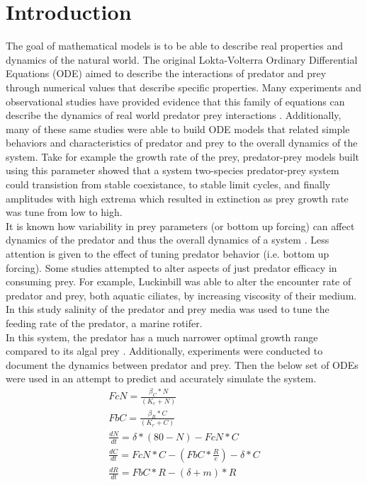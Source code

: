 \documentclass[twocolumn, 9pt]{article}
\begin{document}
\section{Introduction} 
\indent{} The goal of mathematical models is to be able to describe real properties and dynamics of the natural world. The original Lokta-Volterra Ordinary Differential Equations (ODE) aimed to describe the interactions of predator and prey through numerical values that describe specific properties. Many experiments and observational studies have provided evidence that this family of equations can describe the dynamics of real world predator prey interactions \cite{fussmann_crossing_2000, yoshida_rapid_2003, huffaker_experimental_1958, utida_cyclic_1957}. Additionally, many of these same studies were able to build ODE models that related simple behaviors and characteristics of predator and prey to the overall dynamics of the system. Take for example the growth rate of the prey, predator-prey models built using this parameter showed that a system two-species predator-prey system could transistion from stable coexistance, to stable limit cycles, and finally amplitudes with high extrema which resulted in extinction as prey growth rate was tune from low to high. \\
\indent{} It is known how variability in prey parameters (or bottom up forcing) can affect dynamics of the predator and thus the overall dynamics of a system \cite{smith_rosenzweig-macarthur_nodate, mccauley_physiological_1990, mccauley_growth_1990, mccauley_cyclic_1987, mccauley_large-amplitude_1999}. Less attention is given to the effect of tuning predator behavior (i.e. bottom up forcing). Some studies attempted to alter aspects of just predator efficacy in consuming prey. For example, Luckinbill \cite{luckinbill_coexistence_1973, luckinbill_effects_1974} was able to alter the encounter rate of predator and prey, both aquatic ciliates, by increasing viscosity of their medium. In this study salinity of the predator and prey media was used to tune the feeding rate of the predator, a marine rotifer. \\
\indent{} In this system, the predator has a much narrower optimal growth range compared to its algal prey \cite{snell_effect_1986, sarma_effect_nodate, miracle_salinity_nodate}. Additionally, experiments were conducted to document the dynamics between predator and prey. Then the below set of ODEs were used in an attempt to predict and accurately simulate the system.  \\
\begin{align}
    FcN = \frac{\beta_C*N}{(K_c+N)} \\
    FbC = \frac{\beta_R*C}{(K_r+C)} \\
    \frac{dN}{dt}=\delta*(80-N)-FcN*C \\
    \frac{dC}{dt}=FcN*C-(FbC*\frac{R}{e})-\delta*C \\
    \frac{dR}{dt}=FbC*R-(\delta+m)*R 
\end{align}
\end{document}
